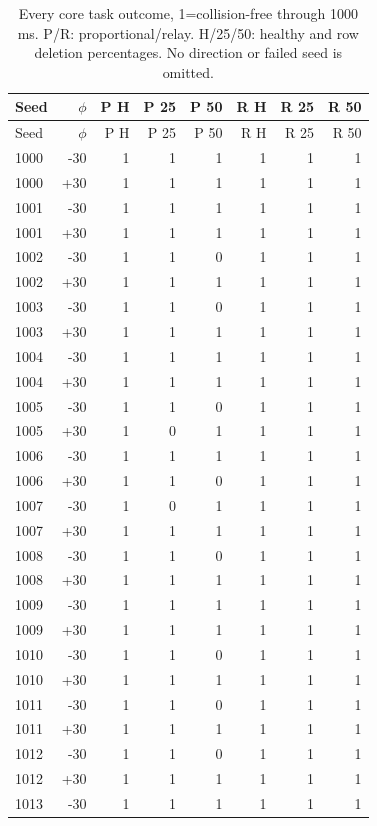\documentclass[10pt,letterpaper]{article}
\begin{document}
{\small
\begin{longtable}{lrrrrrrr}
\caption{Every core task outcome, 1=collision-free through 1000 ms. P/R: proportional/relay. H/25/50: healthy and row deletion percentages. No direction or failed seed is omitted.}\\
\toprule
Seed & $\phi$ & P H & P 25 & P 50 & R H & R 25 & R 50\\
\midrule\endfirsthead
\toprule
Seed & $\phi$ & P H & P 25 & P 50 & R H & R 25 & R 50\\
\midrule\endhead
1000 & -30 & 1 & 1 & 1 & 1 & 1 & 1\\
1000 & +30 & 1 & 1 & 1 & 1 & 1 & 1\\
1001 & -30 & 1 & 1 & 1 & 1 & 1 & 1\\
1001 & +30 & 1 & 1 & 1 & 1 & 1 & 1\\
1002 & -30 & 1 & 1 & 0 & 1 & 1 & 1\\
1002 & +30 & 1 & 1 & 1 & 1 & 1 & 1\\
1003 & -30 & 1 & 1 & 0 & 1 & 1 & 1\\
1003 & +30 & 1 & 1 & 1 & 1 & 1 & 1\\
1004 & -30 & 1 & 1 & 1 & 1 & 1 & 1\\
1004 & +30 & 1 & 1 & 1 & 1 & 1 & 1\\
1005 & -30 & 1 & 1 & 0 & 1 & 1 & 1\\
1005 & +30 & 1 & 0 & 1 & 1 & 1 & 1\\
1006 & -30 & 1 & 1 & 1 & 1 & 1 & 1\\
1006 & +30 & 1 & 1 & 0 & 1 & 1 & 1\\
1007 & -30 & 1 & 0 & 1 & 1 & 1 & 1\\
1007 & +30 & 1 & 1 & 1 & 1 & 1 & 1\\
1008 & -30 & 1 & 1 & 0 & 1 & 1 & 1\\
1008 & +30 & 1 & 1 & 1 & 1 & 1 & 1\\
1009 & -30 & 1 & 1 & 1 & 1 & 1 & 1\\
1009 & +30 & 1 & 1 & 1 & 1 & 1 & 1\\
1010 & -30 & 1 & 1 & 0 & 1 & 1 & 1\\
1010 & +30 & 1 & 1 & 1 & 1 & 1 & 1\\
1011 & -30 & 1 & 1 & 0 & 1 & 1 & 1\\
1011 & +30 & 1 & 1 & 1 & 1 & 1 & 1\\
1012 & -30 & 1 & 1 & 0 & 1 & 1 & 1\\
1012 & +30 & 1 & 1 & 1 & 1 & 1 & 1\\
1013 & -30 & 1 & 1 & 1 & 1 & 1 & 1\\

\end{longtable}}
\end{document}
